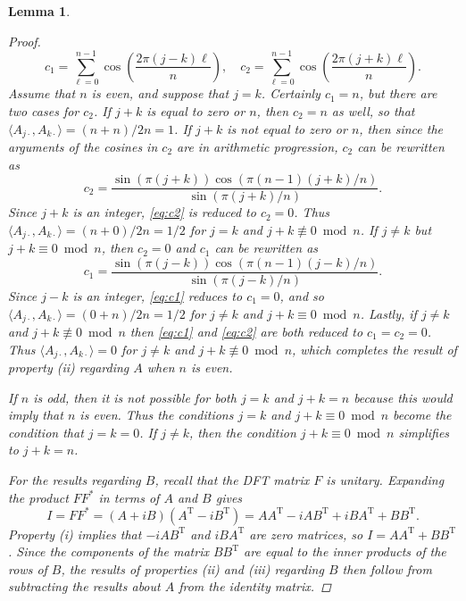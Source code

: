 \documentclass[12pt]{article}
\newcommand{\trans}{\mathrm{T}}	%
\newcommand{\ctrans}{*}	%
\newtheorem{lemma}{Lemma}[section]
\begin{document}
\begin{lemma}
\begin{proof}
\[c_1 = \sum_{\ell=0}^{n-1}\cos\left(\frac{2\pi{(j-k)\ell}}{n}\right), \quad c_2 = \sum_{\ell=0}^{n-1}\cos\left(\frac{2\pi{(j+k)\ell}}{n}\right).\]
\indent Assume that $n$ is even, and suppose that $j = k$. Certainly $c_1 = n$, but there are two cases for $c_2$. If $j + k$ is equal to zero or $n$, then $c_2 = n$ as well, so that $\langle A_{j\cdot}, A_{k\cdot}\rangle = (n+n)/2n = 1$. If $j + k$ is not equal to zero or $n$, then since the arguments of the cosines in $c_2$ are in arithmetic progression, $c_2$ can be rewritten as
\begin{equation}
c_2 = \frac{\sin(\pi(j+k))\cos(\pi(n-1)(j+k)/n)}{\sin(\pi(j+k)/n)}.
\label{eq:c2}
\end{equation}
Since $j+k$ is an integer, \eqref{eq:c2} is reduced to $c_2 = 0$. Thus $\langle A_{j\cdot},A_{k\cdot}\rangle = (n+0)/2n = 1/2$ for $j = k$ and $j + k \not\equiv 0 \bmod n$. If $j \neq k$ but $j+k \equiv 0 \bmod n$, then $c_2 = 0$ and $c_1$ can be rewritten as
\begin{equation}
c_1 = \frac{\sin(\pi(j-k))\cos(\pi(n-1)(j-k)/n)}{\sin(\pi(j-k)/n)}.
\label{eq:c1}
\end{equation}
Since $j-k$ is an integer, \eqref{eq:c1} reduces to $c_1 = 0$, and so $\langle A_{j\cdot},A_{k\cdot}\rangle = (0+n)/2n = 1/2$ for $j \neq k$ and $j + k \equiv 0 \bmod n$. Lastly, if $j \neq k$ and $j+k \not\equiv 0 \bmod n$ then \eqref{eq:c1} and \eqref{eq:c2} are both reduced to $c_1 = c_2 = 0$. Thus $\langle A_{j\cdot},A_{k\cdot}\rangle = 0$ for $j \neq k$ and $j+k \not\equiv 0 \bmod n$, which completes the result of property (ii) regarding $A$ when $n$ is even.  \par
If $n$ is odd, then it is not possible for both $j = k$ and $j + k = n$ because this would imply that $n$ is even. Thus the conditions $j=k$ and $j+k \equiv 0 \bmod n$ become the condition that $j = k = 0$. If $j \neq k$, then the condition $j+k \equiv 0 \bmod n$ simplifies to $j + k = n$. \par 
For the results regarding $B$, recall that the DFT matrix $F$ is unitary. Expanding the product $FF^\ctrans$ in terms of $A$ and $B$ gives
\[I = FF^\ctrans = (A+iB)(A^\trans - iB^\trans) = AA^\trans - iAB^\trans + iBA^\trans + BB^\trans.\]
Property (i) implies that $-iAB^\trans$ and $iBA^\trans$ are zero matrices, so $I = AA^\trans + BB^\trans$. Since the components of the matrix $BB^\trans$ are equal to the inner products of the rows of $B$, the results of properties (ii) and (iii) regarding $B$ then follow from subtracting the results about $A$ from the identity matrix.
\end{proof}
\end{lemma}
\end{document}
